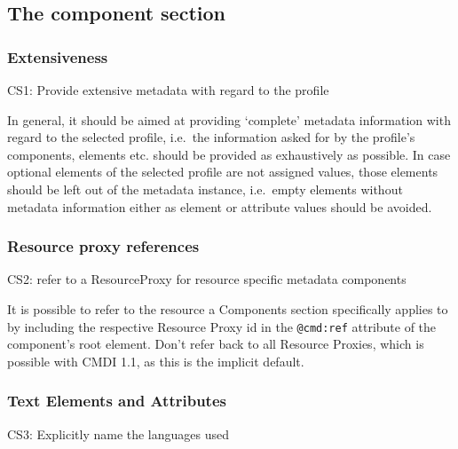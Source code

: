 \subsection{The component section}\label{the-component-section}

\subsubsection{Extensiveness}\label{extensiveness}

CS1: Provide extensive metadata with regard to the profile


In general, it should be aimed at providing `complete' metadata information with regard to the selected profile, i.e.~the information asked for by the profile's components, elements etc. should be provided as exhaustively as possible. In case optional elements of the selected profile are not assigned values, those elements should be left out of the metadata instance, i.e.~empty elements without metadata information either as element or attribute values should be avoided.

\subsubsection{Resource proxy
references}\label{resource-proxy-references}

\label{cs2}
CS2: refer to a ResourceProxy for resource specific metadata components


It is possible to refer to the resource a Components section
specifically applies to by including the respective Resource Proxy id in the \texttt{@cmd:ref} attribute of the component's root element. Don't refer back to all Resource Proxies, which is possible with CMDI 1.1, as this is the implicit default.

\subsubsection{Text Elements and Attributes} \label{text-elements-attributes}

\label{cs3}
CS3: Explicitly name the languages used

 

